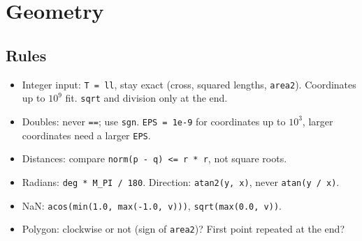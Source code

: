\section{Geometry}

\subsection{Rules}\label{t:geo}
\begin{tip}
\begin{itemize}
\item Integer input: \texttt{T = ll}, stay exact (cross, squared lengths, \texttt{area2}).
  Coordinates up to $10^9$ fit. \texttt{sqrt} and division only at the end.
\item Doubles: never \texttt{==}; use \texttt{sgn}. \texttt{EPS = 1e-9} for coordinates up to
  $10^3$, larger coordinates need a larger \texttt{EPS}.
\item Distances: compare \texttt{norm(p - q) <= r * r}, not square roots.
\item Radians: \texttt{deg * M\_PI / 180}. Direction: \texttt{atan2(y, x)}, never
  \texttt{atan(y / x)}.
\item NaN: \texttt{acos(min(1.0, max(-1.0, v)))}, \texttt{sqrt(max(0.0, v))}.
\item Polygon: clockwise or not (sign of \texttt{area2})? First point repeated at the end?
\end{itemize}
\end{tip}





